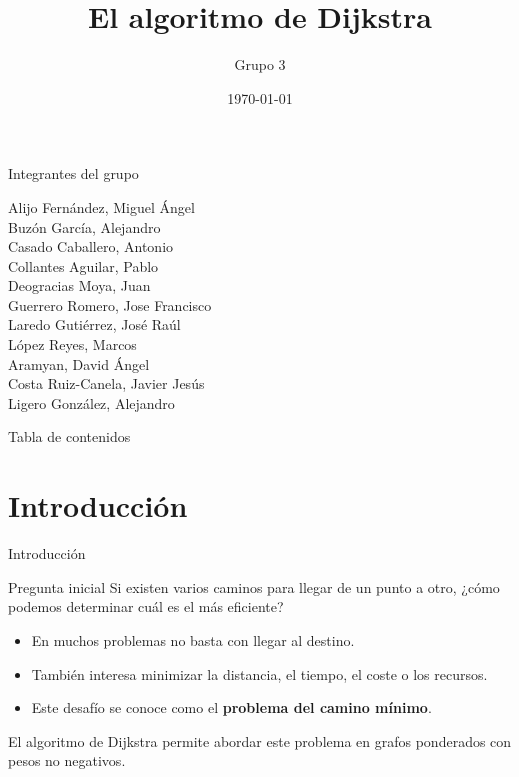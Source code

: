 \documentclass{beamer}
\title{El algoritmo de Dijkstra}
\author{Grupo 3}
\date{\today}
\begin{document}
    \frame{\titlepage}

    \begin{frame}{Integrantes del grupo}
        \begin{center}
            Alijo Fernández, Miguel Ángel \\
            Buzón García, Alejandro \\
            Casado Caballero, Antonio \\
            Collantes Aguilar, Pablo \\
            Deogracias Moya, Juan \\
            Guerrero Romero, Jose Francisco \\
            Laredo Gutiérrez, José Raúl \\
            López Reyes, Marcos \\
            Aramyan, David Ángel \\
            Costa Ruiz-Canela, Javier Jesús \\
            Ligero González, Alejandro
        \end{center}
    \end{frame}

    \begin{frame}{Tabla de contenidos}
        \tableofcontents
    \end{frame}

    \section{Introducción}


    \begin{frame}{Introducción}
        \begin{block}{Pregunta inicial}
            Si existen varios caminos para llegar de un punto a otro, ¿cómo podemos determinar cuál es el más eficiente?
        \end{block}

        \begin{itemize}
            \item En muchos problemas no basta con llegar al destino.
            \item También interesa minimizar la distancia, el tiempo, el coste o los recursos.
            \item Este desafío se conoce como el \textbf{problema del camino mínimo}.
        \end{itemize}

        \vspace{0.2cm}

        El algoritmo de Dijkstra permite abordar este problema en grafos ponderados con pesos no negativos.
    \end{frame}
\end{document}
